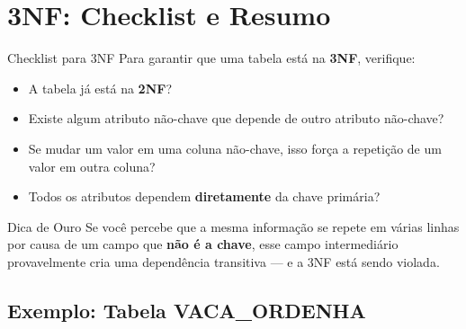 \documentclass[9pt]{beamer}
\begin{document}
\section{3NF: Checklist e Resumo}

\begin{frame}{Checklist para 3NF}
  Para garantir que uma tabela está na \textbf{3NF}, verifique:
  \vspace{0.4cm}
  \begin{itemize}
    \item[$\square$] A tabela já está na \textbf{2NF}?
    \item[$\square$] Existe algum atributo não-chave que depende de outro atributo não-chave?
    \item[$\square$] Se mudar um valor em uma coluna não-chave, isso força a repetição de um valor em outra coluna?
    \item[$\square$] Todos os atributos dependem \textbf{diretamente} da chave primária?
  \end{itemize}
  \vspace{0.4cm}
  \begin{block}{Dica de Ouro}
    Se você percebe que a mesma informação se repete em várias linhas por causa de um campo que \textbf{não é a chave}, esse campo intermediário provavelmente cria uma dependência transitiva --- e a 3NF está sendo violada.
  \end{block}
\end{frame}


\subsection{Exemplo: Tabela VACA\_ORDENHA}
\end{document}
